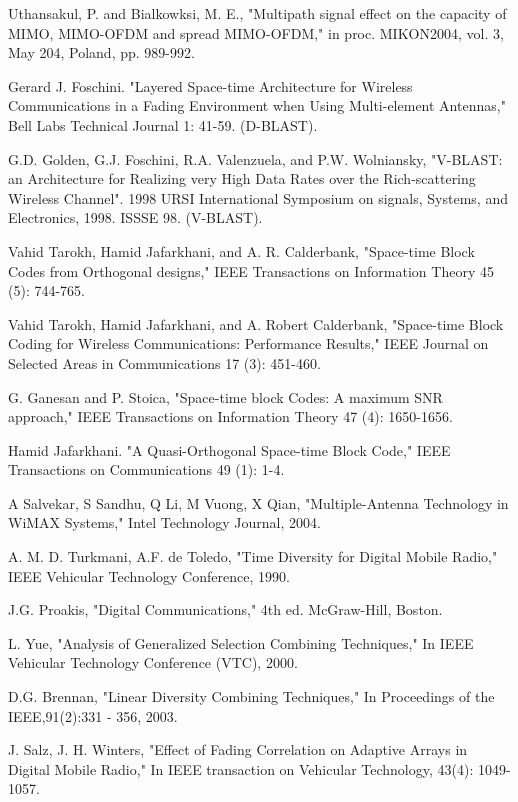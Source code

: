 \begin{thebibliography}{99}
Uthansakul, P. and Bialkowksi, M. E., "Multipath signal effect on
the capacity of MIMO, MIMO-OFDM and spread MIMO-OFDM," in proc.
MIKON2004, vol. 3, May 204, Poland, pp. 989-992.

Gerard J. Foschini. "Layered Space-time Architecture for Wireless
Communications in a Fading Environment when Using Multi-element
Antennas," Bell Labs Technical Journal 1: 41-59. (D-BLAST).

G.D. Golden, G.J. Foschini, R.A. Valenzuela, and P.W. Wolniansky,
"V-BLAST: an Architecture for Realizing very High Data Rates over
the Rich-scattering Wireless Channel". 1998 URSI International
Symposium on signals, Systems, and Electronics, 1998. ISSSE 98.
(V-BLAST).

Vahid Tarokh, Hamid Jafarkhani, and A. R. Calderbank, "Space-time
Block Codes from Orthogonal designs," IEEE Transactions on
Information Theory 45 (5): 744-765.

Vahid Tarokh, Hamid Jafarkhani, and A. Robert Calderbank,
"Space-time Block Coding for Wireless Communications: Performance
Results," IEEE Journal on Selected Areas in Communications 17 (3):
451-460.

G. Ganesan and P. Stoica, "Space-time block Codes: A maximum SNR
approach," IEEE Transactions on Information Theory 47 (4):
1650-1656.

Hamid Jafarkhani. "A Quasi-Orthogonal Space-time Block Code," IEEE
Transactions on Communications 49 (1): 1-4.

A Salvekar, S Sandhu, Q Li, M Vuong, X Qian, "Multiple-Antenna
Technology in WiMAX Systems," Intel Technology Journal, 2004.

A. M. D. Turkmani, A.F. de Toledo, "Time Diversity for Digital
Mobile Radio," IEEE Vehicular Technology Conference, 1990.

J.G. Proakis, "Digital Communications," 4th ed. McGraw-Hill, Boston.

L. Yue, "Analysis of Generalized Selection Combining Techniques," In
IEEE Vehicular Technology Conference (VTC), 2000.

D.G. Brennan, "Linear Diversity Combining Techniques," In
Proceedings of the IEEE,91(2):331 - 356, 2003.

J. Salz, J. H. Winters, "Effect of Fading Correlation on Adaptive
Arrays in Digital Mobile Radio," In IEEE transaction on Vehicular
Technology, 43(4): 1049-1057.


\end{thebibliography}
